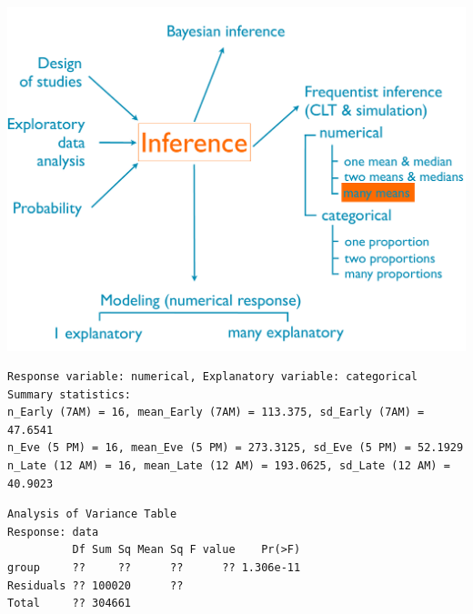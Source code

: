 \documentclass[11pt,containsverbatim,handout,xcolor=xelatex,dvipsnames,table]{beamer}
\begin{document}

\begin{frame}[fragile]

{
{\scriptsize
{}}
}
{
 \includegraphics[width=\textwidth]{figures/map/many_mean}
}

{\scriptsize
\begin{verbatim}
Response variable: numerical, Explanatory variable: categorical
Summary statistics:
n_Early (7AM) = 16, mean_Early (7AM) = 113.375, sd_Early (7AM) = 47.6541
n_Eve (5 PM) = 16, mean_Eve (5 PM) = 273.3125, sd_Eve (5 PM) = 52.1929
n_Late (12 AM) = 16, mean_Late (12 AM) = 193.0625, sd_Late (12 AM) = 40.9023
\end{verbatim}
}

{\small
\begin{verbatim}
Analysis of Variance Table
Response: data
          Df Sum Sq Mean Sq F value    Pr(>F)
group     ??     ??      ??      ?? 1.306e-11
Residuals ?? 100020      ??        
Total     ?? 304661  
\end{verbatim}
}

\end{frame}

\end{document}
